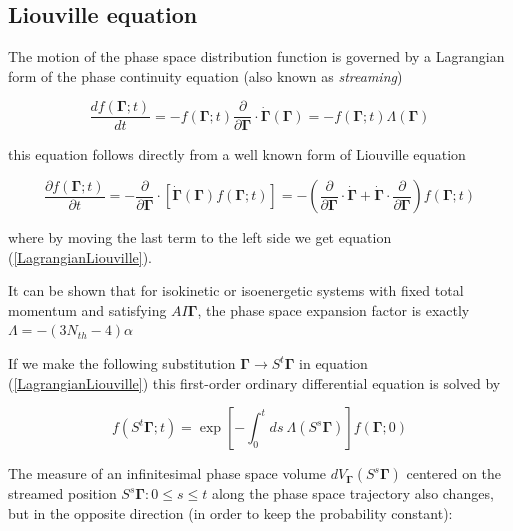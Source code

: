 \documentclass[a4paper,12pt,nofootinbib]{article}
\begin{document}

\subsection{Liouville equation}

The motion of the phase space distribution function is governed by a Lagrangian form of the phase continuity equation (also known as \textit{streaming})

\begin{equation}
\label{LagrangianLiouville}
  \frac{df(\bm{\Gamma};t)}{dt}=-f(\bm{\Gamma};t)\frac{\partial}{\partial \bm{\Gamma}} \cdot \dot{\bm{\Gamma}}(\bm{\Gamma}) = -f(\bm{\Gamma};t)\Lambda(\bm{\Gamma})
\end{equation}

this equation follows directly from a well known form of Liouville equation

\begin{equation}
    \frac{\partial f(\bm{\Gamma};t) }{\partial t}
    = -\frac{\partial}{\partial \bm{\Gamma}} \cdot [\dot{\bm{\Gamma}}(\bm{\Gamma}) f(\bm{\Gamma};t)]
     = -(\frac{\partial}{\partial \bm{\Gamma}} \cdot \dot{\bm{\Gamma}} + \dot{\bm{\Gamma}} \cdot \frac{\partial}{\partial \bm{\Gamma}}) f(\bm{\Gamma};t)
\end{equation}

where by moving the last term to the left side we get equation (\ref{LagrangianLiouville}).


It can be shown that for isokinetic or isoenergetic systems with fixed total momentum and satisfying $AI\bm{\Gamma}$, the phase space expansion factor is exactly $\Lambda = - (3N_{th} -4) \alpha $ 

If we make the following substitution $\bm{\Gamma} \to S^t\bm{\Gamma}$ in equation (\ref{LagrangianLiouville}) this first-order ordinary differential equation is solved by

\begin{equation}
\label{distributionStreaming}
  f(S^t\bm{\Gamma};t)=\exp[-\int_0^t ds\ \Lambda(S^s\bm{\Gamma})]f(\bm{\Gamma};0)
\end{equation}

The measure of an infinitesimal phase space volume $dV_{\bm{\Gamma}}(S^s \bm{\Gamma})$ centered on the streamed position $S^s\bm{\Gamma} : 0 \leq s \leq t $ along the phase space trajectory also changes, but in the opposite direction (in order to keep the probability constant):
\end{document}

